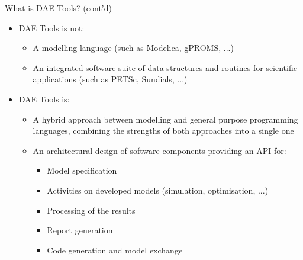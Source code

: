 \documentclass[compress,newPxFont,sthlmFooter]{beamer}
\begin{document}
\begin{frame}{What is DAE Tools? (cont'd)} 
  \begin{itemize}
    \item DAE Tools \alert{is not}:
        \begin{itemize}
            \item A modelling language (such as Modelica, gPROMS, ...)
            \item An integrated software suite of data structures and routines for scientific applications (such as PETSc, Sundials, ...)
        \end{itemize}
    \item DAE Tools \alert{is}:
        \begin{itemize}
            \item A \alert{hybrid approach} between \alert{modelling} and \alert{general purpose} programming languages,
                  \alert{combining the strengths of both approaches} into a single one
            \item An \alert{architectural design of software components}
                  providing an API for:
                \begin{itemize}
                    \item \alert{Model specification}
                    \item Activities on developed models (\alert{simulation}, \alert{optimisation}, ...)
                    \item \alert{Processing of the results}
                    \item \alert{Report generation}
                    \item \alert{Code generation} and \alert{model exchange}
                \end{itemize}
        \end{itemize}
  \end{itemize}
\end{frame}
\end{document}
